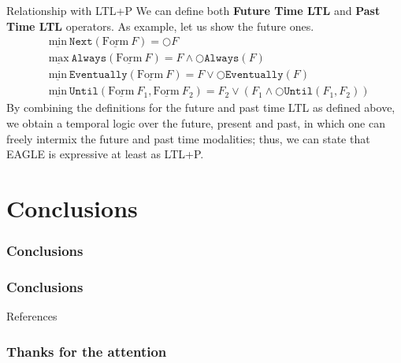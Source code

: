 \documentclass[aspectratio=169,t,xcolor=table]{beamer}
\begin{document}
\begin{frame}{Relationship with LTL+P}
    We can define both \textbf{Future Time LTL} and \textbf{Past Time LTL} operators. As example, let us show the future ones.
    \begin{align*}
        & \underline{\text{min}}\ \mathtt{Next}(\underline{\text{Form}}\ F) = \bigcirc F \\
        & \underline{\text{max}}\ \mathtt{Always}(\underline{\text{Form}}\ F) = F \land \bigcirc \mathtt{Always}(F) \\
        & \underline{\text{min}}\ \mathtt{Eventually}(\underline{\text{Form}}\ F) = F \lor \bigcirc \mathtt{Eventually}(F) \\
        & \underline{\text{min}}\ \mathtt{Until}(\underline{\text{Form}}\ F_1, \underline{\text{Form}}\ F_2) = F_2 \lor (F_1 \land \bigcirc \mathtt{Until}(F_1,F_2))
    \end{align*}
    By combining the definitions for the future and past time LTL as defined above, we obtain a temporal logic over the future, present and past, in which one can freely intermix the future and past time modalities; thus, we can state that EAGLE is expressive at least as LTL+P.

\end{frame}

\section{Conclusions}
\begin{frame}{}
    \frametitle{Conclusions}
\end{frame}


\begin{frame}
    \frametitle{Conclusions}

\end{frame}

\begin{frame}[allowframebreaks]{References}
    \nocite{*} 
    \printbibliography
\end{frame}

\begin{frame}{}
    \frametitle{Thanks for the attention}
\end{frame}
\end{document}
